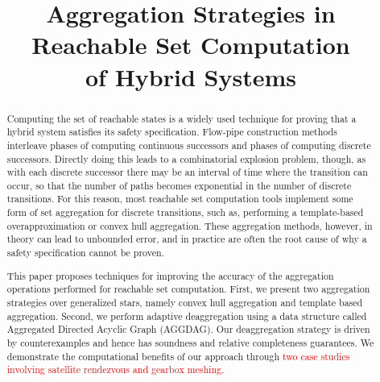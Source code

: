 \documentclass[sigconf]{acmart}
\newcommand{\new}[1]{\textcolor{red}{#1}}
\newcommand{\new}[1]{#1}
\begin{document}
%
\title[Aggregation Strategies in Reachable Set Computation]{Aggregation Strategies in Reachable Set Computation\\ of Hybrid Systems}

%
%
%
%

%
\begin{abstract}
  Computing the set of reachable states is a widely used technique for proving that a hybrid system satisfies its safety specification.
  Flow-pipe construction methods interleave phases of computing continuous successors and phases of computing discrete successors.
  Directly doing this leads to a combinatorial explosion problem, though, as with each discrete successor there may be an interval of time
  where the transition can occur, so that the number of paths becomes exponential in the number of discrete transitions.
  For this reason, most reachable set computation tools implement some form of set aggregation for discrete transitions, such as, performing a
  template-based overapproximation or convex hull aggregation.
  These aggregation methods, however, in theory can lead to unbounded error, and in practice are often
  the root cause of why a safety specification cannot be proven.

  This paper proposes techniques for improving the accuracy of the aggregation operations performed for reachable set computation.
  First, we present two aggregation strategies over generalized stars, namely convex hull aggregation and template based aggregation.
  Second, we perform adaptive deaggregation using a data structure called Aggregated Directed Acyclic Graph (AGGDAG).
  Our deaggregation strategy is driven by counterexamples and hence has soundness and relative completeness guarantees.
  We demonstrate the computational benefits of our approach through \new{two case studies involving satellite rendezvous and gearbox meshing}.
\end{abstract}
\end{document}

